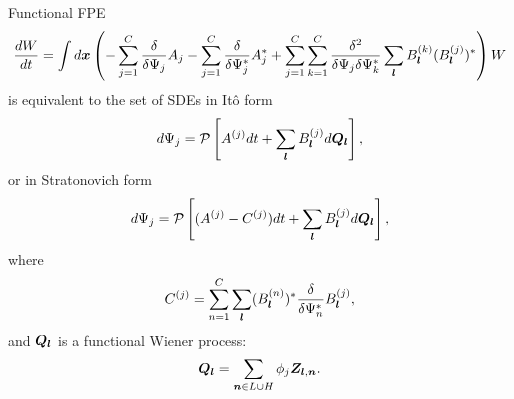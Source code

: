 \begin{theorem}
Functional FPE
\[
	\frac{dW}{dt}
	= \int d\boldsymbol{x} \left(
		- \sum_{j=1}^C \frac{\delta}{\delta \Psi_j} A_j
		- \sum_{j=1}^C \frac{\delta}{\delta \Psi_j^*} A_j^*
		+ \sum_{j=1}^C \sum_{k=1}^C \frac{\delta^2}{\delta \Psi_j \delta \Psi_k^*}
			\sum_{\boldsymbol{l}} B_{\boldsymbol{l}}^{(k)} (B_{\boldsymbol{l}}^{(j)})^*
	\right) W
\]
is equivalent to the set of SDEs in It\^{o} form
\[
	d\Psi_j = \mathcal{P} \left[
		A^{(j)} dt + \sum_{\boldsymbol{l}} B_{\boldsymbol{l}}^{(j)} d\bm{Q}_{\boldsymbol{l}}
	\right],
\]
or in Stratonovich form
\[
	d\Psi_j = \mathcal{P} \left[
		(A^{(j)} - C^{(j)}) dt + \sum_{\boldsymbol{l}} B_{\boldsymbol{l}}^{(j)} d\bm{Q}_{\boldsymbol{l}}
	\right],
\]
where
\[
	C^{(j)} = \sum_{n=1}^C \sum_{\boldsymbol{l}}
		(B_{\boldsymbol{l}}^{(n)})^*
		\frac{\delta}{\delta \Psi_n^*}
		B_{\boldsymbol{l}}^{(j)},
\]
and $\bm{Q}_{\boldsymbol{l}}$ is a functional Wiener process:
\[
	\bm{Q}_{\boldsymbol{l}} = \sum_{\boldsymbol{n} \in L \cup H} \phi_j \boldsymbol{Z}_{\boldsymbol{l},\boldsymbol{n}}.
\]
\end{theorem}
